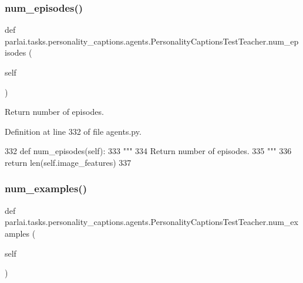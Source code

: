 \subsubsection{\texorpdfstring{num\+\_\+episodes()}{num\_episodes()}}
{\footnotesize\ttfamily def parlai.\+tasks.\+personality\+\_\+captions.\+agents.\+Personality\+Captions\+Test\+Teacher.\+num\+\_\+episodes (\begin{DoxyParamCaption}\item[{}]{self }\end{DoxyParamCaption})}

\begin{DoxyVerb}Return number of episodes.
\end{DoxyVerb}
 

Definition at line 332 of file agents.\+py.


\begin{DoxyCode}
332     \textcolor{keyword}{def }num\_episodes(self):
333         \textcolor{stringliteral}{"""}
334 \textcolor{stringliteral}{        Return number of episodes.}
335 \textcolor{stringliteral}{        """}
336         \textcolor{keywordflow}{return} len(self.image\_features)
337 
\end{DoxyCode}
\mbox{\label{classparlai_1_1tasks_1_1personality__captions_1_1agents_1_1PersonalityCaptionsTestTeacher_aa3c10b49dc8d2510f8d28846194ac2a6}} 
\subsubsection{\texorpdfstring{num\+\_\+examples()}{num\_examples()}}
{\footnotesize\ttfamily def parlai.\+tasks.\+personality\+\_\+captions.\+agents.\+Personality\+Captions\+Test\+Teacher.\+num\+\_\+examples (\begin{DoxyParamCaption}\item[{}]{self }\end{DoxyParamCaption})}

